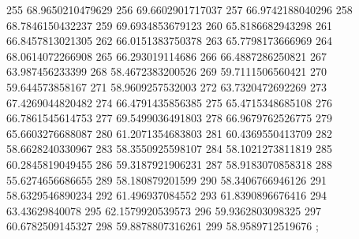 {255 68.9650210479629
256 69.6602901717037
257 66.9742188040296
258 68.7846150432237
259 69.6934853679123
260 65.8186682943298
261 66.8457813021305
262 66.0151383750378
263 65.7798173666969
264 68.0614072266908
265 66.293019114686
266 66.4887286250821
267 63.987456233399
268 58.4672383200526
269 59.7111506560421
270 59.644573858167
271 58.9609257532003
272 63.7320472692269
273 67.4269044820482
274 66.4791435856385
275 65.4715348685108
276 66.7861545614753
277 69.5499036491803
278 66.9679762526775
279 65.6603276688087
280 61.2071354683803
281 60.4369550413709
282 58.6628240330967
283 58.3550925598107
284 58.1021273811819
285 60.2845819049455
286 59.3187921906231
287 58.9183070858318
288 55.6274656686655
289 58.180879201599
290 58.3406766946126
291 58.6329546890234
292 61.496937084552
293 61.8390896676416
294 63.43629840078
295 62.1579920539573
296 59.9362803098325
297 60.6782509145327
298 59.8878807316261
299 58.9589712519676
};
